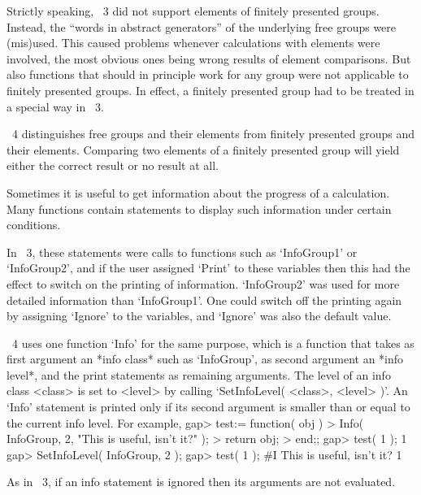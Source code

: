 Strictly speaking, {\GAP}~3 did not support elements of finitely
presented groups.
Instead, the ``words in abstract generators'' of the underlying free
groups were (mis)used.
This caused problems whenever calculations with elements were involved,
the most obvious ones being wrong results of element comparisons.
But also functions that should in principle work for any group were not
applicable to finitely presented groups.
In effect, a finitely presented group had to be treated in a special way
in {\GAP}~3.

{\GAP}~4 distinguishes free groups and their elements from finitely
presented groups and their elements.
Comparing two elements of a finitely presented group will yield either
the correct result or no result at all.



Sometimes it is useful to get information about the progress of a
calculation.
Many {\GAP} functions contain statements to display such information
under certain conditions.

In {\GAP}~3, these statements were calls to functions such as
`InfoGroup1' or `InfoGroup2', and if the user assigned `Print' to
these variables then this had the effect to switch on the printing of
information.
`InfoGroup2' was used for more detailed information than `InfoGroup1'.
One could switch off the printing again by assigning `Ignore' to the
variables, and `Ignore' was also the default value.

{\GAP}~4 uses one function `Info' for the same purpose,
which is a function that takes as first argument an *info class* such as
`InfoGroup', as second argument an *info level*, and the print statements
as remaining arguments.
The level of an info class <class> is set to <level> by calling
`SetInfoLevel( <class>, <level> )'.
An `Info' statement is printed only if its second argument is smaller than
or equal to the current info level.
For example,
\begintt
    gap> test:= function( obj )
    > Info( InfoGroup, 2, "This is useful, isn't it?" );
    > return obj;
    > end;;
    gap> test( 1 );
    1
    gap> SetInfoLevel( InfoGroup, 2 );
    gap> test( 1 );
    #I  This is useful, isn't it?
    1
\endtt

As in {\GAP}~3, if an info statement is ignored then its arguments are
not evaluated.



